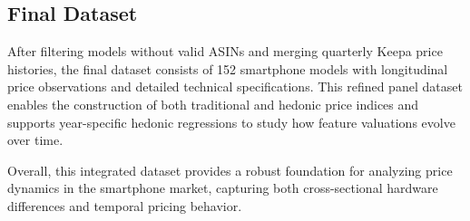 \documentclass[12pt]{article}
\begin{document}
\subsection{Final Dataset}

After filtering models without valid ASINs and merging quarterly Keepa price histories, the final dataset consists of 152 smartphone models with longitudinal price observations and detailed technical specifications. This refined panel dataset enables the construction of both traditional and hedonic price indices and supports year-specific hedonic regressions to study how feature valuations evolve over time.

Overall, this integrated dataset provides a robust foundation for analyzing price dynamics in the smartphone market, capturing both cross-sectional hardware differences and temporal pricing behavior.





\end{document}

